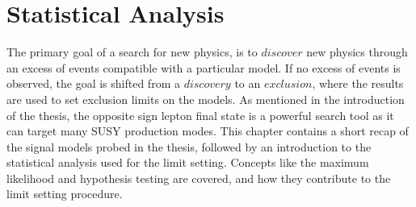 \chapter{Statistical Analysis}\label{sec:stats}
\noindent\justify
The primary goal of a search for new physics, is to $discover$ new physics through an excess of events compatible with a particular model. 
If no excess of events is observed, the goal is shifted from a $discovery$ to an $exclusion$, where the results are used to set exclusion limits on the models.
As mentioned in the introduction of the thesis, the opposite sign lepton final state is a powerful search tool as it can target many SUSY production modes. 
\newpara
\noindent\justify
This chapter contains a short recap of the signal models probed in the thesis, followed by an introduction to the statistical analysis used for the limit setting. 
Concepts like the maximum likelihood and hypothesis testing are covered, and how they contribute to the limit setting procedure.
\newpage
